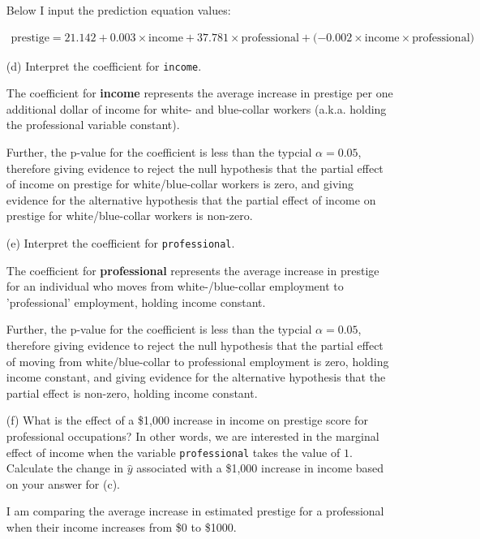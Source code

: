 \documentclass[12pt,letterpaper]{article}
\begin{document}
\begin{enumerate}
	\noindent Below I input the prediction equation values:
	
	\begin{align*}
		\text{prestige} = 21.142 + 0.003 \times  \text{income} + 37.781 \times  \text{professional} + (-0.002 \times  \text{income} \times \text{professional)}
	\end{align*}
	
\newpage
	\item [(d)]
	Interpret the coefficient for \texttt{income}.
	
	\noindent The coefficient for \textbf{income} represents the average increase in prestige per one additional dollar of income for white- and blue-collar workers (a.k.a. holding the professional variable constant).
	
	Further, the p-value for the coefficient is less than the typcial $\alpha = 0.05$, therefore giving evidence to reject the null hypothesis that the partial effect of income on prestige for white/blue-collar workers is zero, and giving evidence for the alternative hypothesis that the partial effect of income on prestige for white/blue-collar workers is non-zero.
	
	\item [(e)]
	Interpret the coefficient for \texttt{professional}.
	
	\noindent The coefficient for \textbf{professional} represents the average increase in prestige for an individual who moves from white-/blue-collar employment to 'professional' employment, holding income constant.
	
	Further, the p-value for the coefficient is less than the typcial $\alpha = 0.05$, therefore giving evidence to reject the null hypothesis that the partial effect of moving from white/blue-collar to professional employment is zero, holding income constant, and giving evidence for the alternative hypothesis that the partial effect is non-zero, holding income constant.
	
	\item [(f)]
	What is the effect of a \$1,000 increase in income on prestige score for professional occupations? In other words, we are interested in the marginal effect of income when the variable \texttt{professional} takes the value of $1$. Calculate the change in $\hat{y}$ associated with a \$1,000 increase in income based on your answer for (c).
	
	\noindent I am comparing the average increase in estimated prestige for a professional when their income increases from \$0 to \$1000.
	

\end{enumerate}
\end{document}
